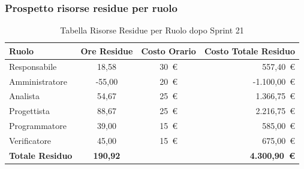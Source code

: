 \subsubsection{Prospetto risorse residue per ruolo}
\begin{table}[H]
    \centering
    \renewcommand{\arraystretch}{1.3}
    \begin{tabularx}{\textwidth}{|X|c|c|r|}
        \hline
        \textbf{Ruolo} & \textbf{Ore Residue} & \textbf{Costo Orario} &
        \textbf{Costo Totale Residuo} \\
        \hline
        Responsabile   & 18,58 & 30~\euro & 557{,}40~\euro \\
        Amministratore & {-55,00} & 20~\euro & {-1.100{,}00~\euro} \\
        Analista       & 54,67 & 25~\euro & 1.366{,}75~\euro \\
        Progettista    & 88,67 & 25~\euro & 2.216{,}75~\euro \\
        Programmatore  & 39,00 & 15~\euro & 585{,}00~\euro \\
        Verificatore   & 45,00 & 15~\euro & 675{,}00~\euro \\
        \hline
        \textbf{Totale Residuo} & \textbf{190,92} & &
        \textbf{4.300{,}90~\euro} \\
        \hline
    \end{tabularx}
    \caption{Tabella Risorse Residue per Ruolo dopo Sprint 21}
\end{table}

